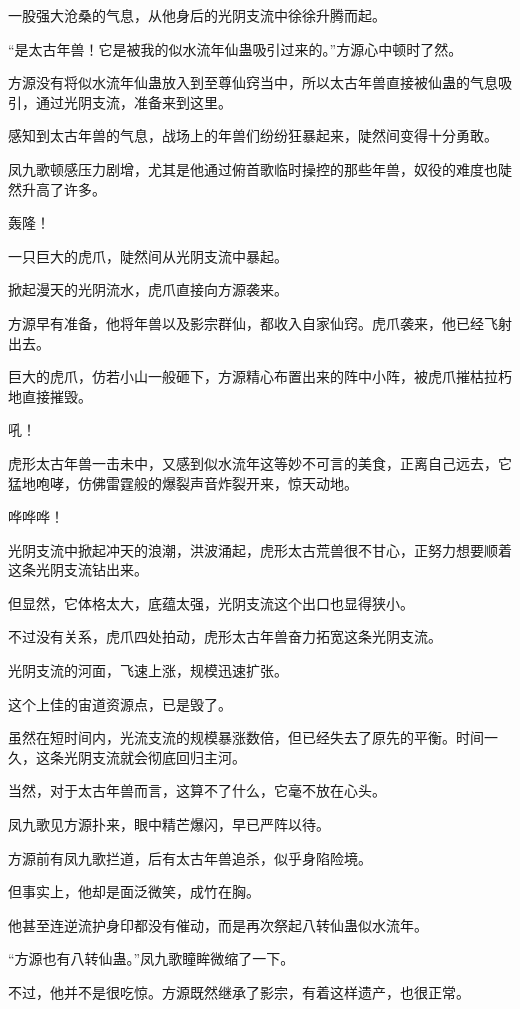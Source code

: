 \begin{this_body}
一股强大沧桑的气息，从他身后的光阴支流中徐徐升腾而起。

“是太古年兽！它是被我的似水流年仙蛊吸引过来的。”方源心中顿时了然。

方源没有将似水流年仙蛊放入到至尊仙窍当中，所以太古年兽直接被仙蛊的气息吸引，通过光阴支流，准备来到这里。

感知到太古年兽的气息，战场上的年兽们纷纷狂暴起来，陡然间变得十分勇敢。

凤九歌顿感压力剧增，尤其是他通过俯首歌临时操控的那些年兽，奴役的难度也陡然升高了许多。

轰隆！

一只巨大的虎爪，陡然间从光阴支流中暴起。

掀起漫天的光阴流水，虎爪直接向方源袭来。

方源早有准备，他将年兽以及影宗群仙，都收入自家仙窍。虎爪袭来，他已经飞射出去。

巨大的虎爪，仿若小山一般砸下，方源精心布置出来的阵中小阵，被虎爪摧枯拉朽地直接摧毁。

吼！

虎形太古年兽一击未中，又感到似水流年这等妙不可言的美食，正离自己远去，它猛地咆哮，仿佛雷霆般的爆裂声音炸裂开来，惊天动地。

哗哗哗！

光阴支流中掀起冲天的浪潮，洪波涌起，虎形太古荒兽很不甘心，正努力想要顺着这条光阴支流钻出来。

但显然，它体格太大，底蕴太强，光阴支流这个出口也显得狭小。

不过没有关系，虎爪四处拍动，虎形太古年兽奋力拓宽这条光阴支流。

光阴支流的河面，飞速上涨，规模迅速扩张。

这个上佳的宙道资源点，已是毁了。

虽然在短时间内，光流支流的规模暴涨数倍，但已经失去了原先的平衡。时间一久，这条光阴支流就会彻底回归主河。

当然，对于太古年兽而言，这算不了什么，它毫不放在心头。

凤九歌见方源扑来，眼中精芒爆闪，早已严阵以待。

方源前有凤九歌拦道，后有太古年兽追杀，似乎身陷险境。

但事实上，他却是面泛微笑，成竹在胸。

他甚至连逆流护身印都没有催动，而是再次祭起八转仙蛊似水流年。

“方源也有八转仙蛊。”凤九歌瞳眸微缩了一下。

不过，他并不是很吃惊。方源既然继承了影宗，有着这样遗产，也很正常。


\end{this_body}
